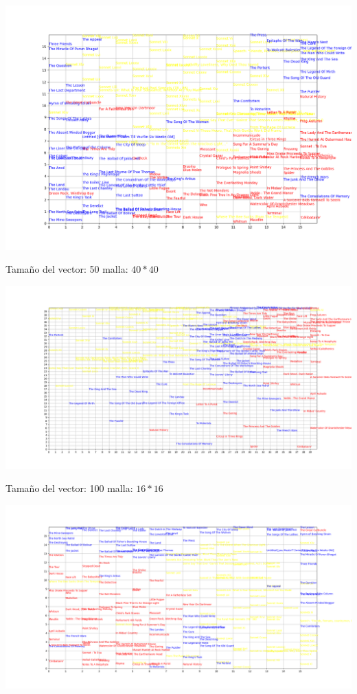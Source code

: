 \documentclass[a4paper, 11pt, oneside]{article}
\begin{document}
\begin{center}
\includegraphics[scale=0.35]{Imagenes/WShakespeareRKiplingSPlathGlove50G16x16.png}    
\end{center}
Tamaño del vector: 50 malla: $40*40$
\begin{center}
    \includegraphics[scale=0.25]{Imagenes/WShakespeareRKiplingSPlathGlove50G40x40.png}
\end{center}
Tamaño del vector: 100 malla: $16*16$
\begin{center}
    \includegraphics[scale=0.25]{Imagenes/WShakespeareRKiplingSPlathGlove100G16x16.png}
\end{center}
\end{document}
